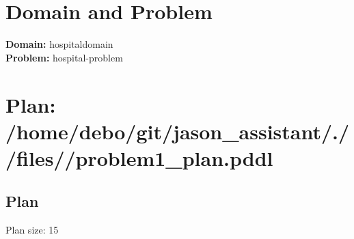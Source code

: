 \documentclass[a4paper,12pt]{article}
\author{\mbox{\sc {\sc Val}}}
\begin{document}
 \maketitle 
\section{Domain and Problem}
{\bf Domain:} hospitaldomain\\
{\bf Problem:} hospital-problem
\section{\sloppy Plan: /\-home/\-debo/\-git/\-jason\_assistant/\-./\-/\-files/\-/\-problem1\_plan.pddl}
\subsection{Plan}
Plan size: 15
\end{document}
